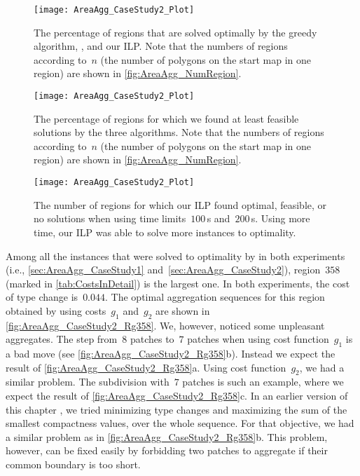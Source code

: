 \begin{figure}[tb]
\centering
\texttt{[image: AreaAgg\_CaseStudy2\_Plot]}
\caption{The percentage of regions that are solved 
	optimally by the greedy algorithm, \Astar, and our ILP.
	Note that the numbers of regions according to~$n$ 
	(the number of polygons on the start map in one region) 
	are shown in \fig\ref{fig:AreaAgg_NumRegion}.}
\label{fig:AreaAgg_CaseStudy2_Percentage_Optimal}
%
\par\vspace{\baselineskip} %
%
\centering
\texttt{[image: AreaAgg\_CaseStudy2\_Plot]}
\caption{The percentage of regions for which we found at 
	least feasible solutions by the three algorithms.
	Note that the numbers of regions according to~$n$ 
	(the number of polygons on the start map in one region) 
	are shown in \fig\ref{fig:AreaAgg_NumRegion}.}
\label{fig:AreaAgg_CaseStudy2_Percentage_Feasible}
\end{figure}

\begin{figure}[tb]
\centering
\texttt{[image: AreaAgg\_CaseStudy2\_Plot]}
\caption{The number of regions for which
	our ILP found optimal, feasible, or no solutions 
	when using time limits~$100\,$s and~$200\,$s.
	Using more time, our ILP was able to 
	solve more instances to optimality.}
\label{fig:AreaAgg_CaseStudy2_ILP}
\end{figure}

Among all the instances that were solved to optimality by \Astar
in both experiments (i.e., \sects\ref{sec:AreaAgg_CaseStudy1} 
and~\ref{sec:AreaAgg_CaseStudy2}),
region~$358$
(marked in \tab\ref{tab:CostsInDetail})
is the largest one.
In both experiments, the cost of type change is~$0.044$.
The optimal aggregation sequences for this region
obtained by using costs~$g_1$ and~$g_2$
are shown in \fig\ref{fig:AreaAgg_CaseStudy2_Rg358}.
We, however, noticed some unpleasant aggregates.
The step from~$8$ patches to~$7$ patches 
when using cost function~$g_1$ is a bad move
(see \fig\ref{fig:AreaAgg_CaseStudy2_Rg358}b).
Instead we expect the result of 
\fig\ref{fig:AreaAgg_CaseStudy2_Rg358}a.
Using cost function~$g_2$, we had a similar problem. 
The subdivision with~$7$ patches is such an example,
where we expect the result of 
\fig\ref{fig:AreaAgg_CaseStudy2_Rg358}c.
In an earlier version of this chapter \parencite{Peng2017AStar},
we tried minimizing type changes 
and maximizing the sum of the smallest compactness values, 
over the whole sequence.
For that objective, we had a similar problem as 
in \fig\ref{fig:AreaAgg_CaseStudy2_Rg358}b.
This problem, however, can be fixed easily 
by forbidding two patches to aggregate 
if their common boundary is too short.



